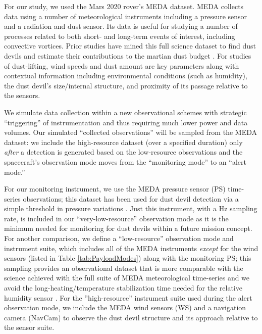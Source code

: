 For our study, we used the Mars 2020 rover's \gls{MEDA} dataset. 
\acrshort{MEDA} collects data using a number of meteorological instruments including a pressure sensor and a radiation and dust sensor. 
Its data is useful for studying a number of processes related to both short- and long-term events of interest, including convective vortices. 
Prior studies have mined this full science dataset to find dust devils and estimate their contributions to the martian dust budget \citep[e.g.,][]{Jackson2022,Jackson2022b}.
For studies of dust-lifting, wind speeds and dust amount are key parameters along with contextual information including environmental conditions (such as humidity), the dust devil's size/internal structure, and proximity of its passage relative to the sensors. 

We simulate data collection within a new observational schemes with strategic ``triggering'' of instrumentation and thus requiring much lower power and data volumes. 
Our simulated ``collected observations'' will be sampled from the MEDA dataset: we include the high-resource dataset (over a specified duration) only \emph{after} a detection is generated based on the low-resource observations and the spacecraft's observation mode moves from the ``monitoring mode'' to an ``alert mode.''

For our monitoring instrument, we use the \gls{MEDA} pressure sensor (PS) time-series observations; this dataset has been used for dust devil detection via a simple threshold in pressure variations \citep{Jackson2022}. 
Just this instrument, with a \unit[1]{Hz} sampling rate, is included in our ``very-low-resource'' observation mode as it is the minimum needed for monitoring for dust devils within a future mission concept. 
For another comparison, we define a ``low-resource'' observation mode and instrument suite, which includes all of the \gls{MEDA} instruments \emph{except} for the wind sensors (listed in Table \ref{tab:PayloadModes}) along with the monitoring PS; this sampling provides an observational dataset that is more comparable with the science achieved with the full suite of \gls{MEDA} meteorological time-series and we avoid the long-heating/temperature stabilization time needed for the relative humidity sensor \cite{}.
For the ''high-resource'' instrument suite used during the alert observation mode, we include the \gls{MEDA} wind sensors (WS) and a navigation camera (NavCam) to observe the dust devil structure and its approach relative to the sensor suite.

